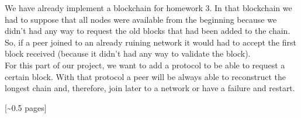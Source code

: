 \documentclass[12pt,a4paper,draft]{article}
\begin{document}
We have already implement a blockchain for homework 3. In that blockchain we had to suppose that all nodes were available from the beginning because we didn't had any way to request the old blocks that had been added to the chain. 
So, if a peer joined to an already ruining network it would had to accept the first block received (because it didn't had any way to validate the block). \\


For this part of our project, we want to add a protocol to be able to request a certain block. With that protocol a peer will be always able to reconstruct the longest chain and, therefore, join later to a network or have a failure and restart.

[\textasciitilde{}0.5 pages]
\end{document}
